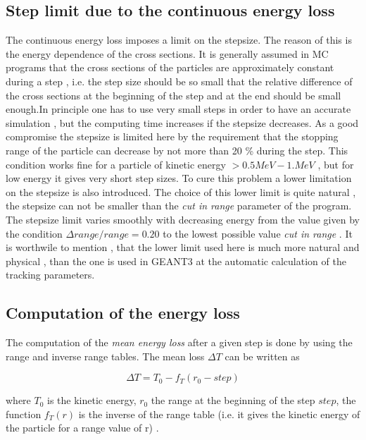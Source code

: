  
 \subsection{Step limit due to the continuous energy loss}

 The continuous energy loss imposes a limit on the stepsize. 
 The reason of this is the
energy dependence of the cross sections. It is generally assumed in MC programs that
the cross sections of the particles are approximately constant during a step , i.e.
 the step size should be so small that the relative difference of the cross sections
at the beginning of the step and at the end should be small enough.In principle one
has to use very small steps in order to have an accurate simulation , but the computing
time increases if the stepsize decreases. As a good compromise the stepsize is
limited here by the requirement that the stopping range of the particle can
decrease by not more than 20 \% during the step. This condition works fine for
a particle of kinetic energy \(> 0.5 MeV - 1. MeV\) , but for low energy it 
gives very short step sizes.
 To cure this problem a lower limitation on the stepsize is also introduced.
The choice of this lower limit is quite natural , the stepsize can not be
smaller than the {\em cut in range} parameter of the program. The stepsize 
limit varies smoothly with decreasing energy from the value given by the
condition \(\Delta range/range=0.20\) to the lowest possible value
 {\em cut in range} .
It is worthwile to mention , that the lower limit used here is much more
natural and physical , than the one is used in GEANT3 at the automatic
calculation of the tracking parameters. 

 \subsection{Computation of the energy loss}

 The computation of the {\em mean energy loss} after a given step is done
by using the range and inverse range tables. The mean loss \(\Delta T\) 
 can be written as

  \begin{equation}
       \Delta T = T_0 - f_T(r_0-step)
  \end{equation}

 where \(T_0\) is the kinetic energy,
       \(r_0\)    the range           at the beginning of the step \(step\),
        the function \(f_T(r)\) is the inverse of the range table (i.e. it
        gives the kinetic energy of the particle for a range value of r) .
       
